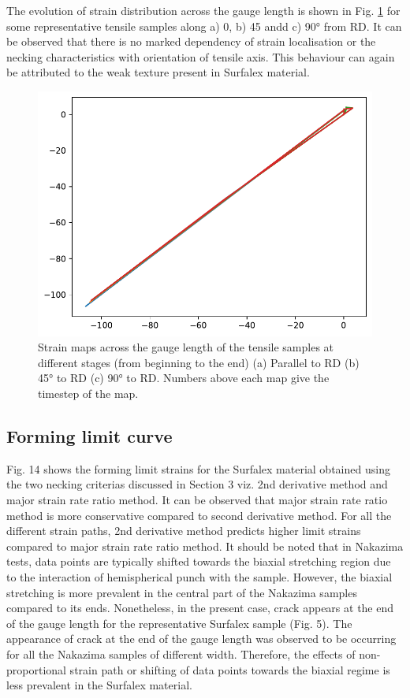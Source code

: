 \documentclass[11pt]{article} %
\begin{document}
The evolution of strain distribution across the gauge length is shown in Fig. \ref{fig:strain_maps} for some representative tensile samples along a) 0, b) 45 andd c) \ang{90} from RD. It can be observed that there is no marked dependency of strain localisation or the necking characteristics with orientation of tensile axis. This behaviour can again be attributed to the weak texture present in Surfalex material. 

\begin{figure}[h]
	\includegraphics[width=\textwidth]{figures/strain_maps}
	\centering
	\caption{Strain maps across the gauge length of the tensile samples at different stages (from beginning to the end) (a) Parallel to RD (b) \ang{45} to RD (c) \ang{90} to RD. Numbers above each map give the timestep of the map.}
	\label{fig:strain_maps}
\end{figure}

\subsection{Forming limit curve}
Fig. 14 shows the forming limit strains for the Surfalex material obtained using the two necking criterias discussed in Section 3 viz. 2nd derivative method and major strain rate ratio method. It can be observed that major strain rate ratio method is more conservative compared to second derivative method. For all the different strain paths, 2nd derivative method predicts higher limit strains compared to major strain rate ratio method. It should be noted that in Nakazima tests, data points are typically shifted towards the biaxial stretching region due to the interaction of hemispherical punch with the sample. However, the biaxial stretching is more prevalent in the central part of the Nakazima samples compared to its ends. Nonetheless, in the present case, crack appears at the end of the gauge length for the representative Surfalex sample (Fig. 5). The appearance of crack at the end of the gauge length was observed to be occurring for all the Nakazima samples of different width. Therefore, the effects of non-proportional strain path or shifting of data points towards the biaxial regime is less prevalent in the Surfalex material. 




\end{document}

